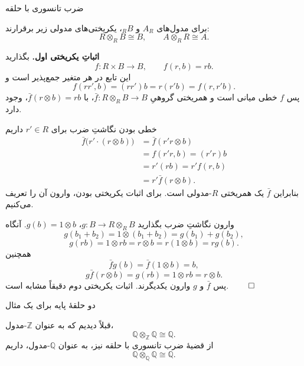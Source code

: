 \begin{frame}[t]{ضرب تانسوری با حلقه}
\label{lec20:unit-isomorphisms}
\begin{theorem}
برای مدول‌های \(A_R\) و \({}_R B\)، یکریختی‌های مدولی زیر برقرارند:
\[
    R\otimes_R B\cong B,\qquad A\otimes_R R\cong A.
\]
\end{theorem}
\textbf{اثباتِ یکریختی اول.} بگذارید
\[
    f:R\times B\longrightarrow B,\qquad f(r,b)=rb.
\]
این تابع در هر متغیر جمع‌پذیر است و
\[
    f(rr',b)=(rr')b=r(r'b)=f(r,r'b).
\]
پس \(f\) خطی میانی است و همریختی گروهیِ
\(\bar f:R\otimes_R B\to B\)، با \(\bar f(r\otimes b)=rb\)، وجود دارد.
\end{frame}

\begin{frame}[t]{خطی بودن نگاشتِ ضرب}
\label{lec20:unit-map-linear}
برای \(r'\in R\) داریم
\[
\begin{aligned}
\bar f\bigl(r'\cdot(r\otimes b)\bigr)
  &=\bar f(r'r\otimes b)\\
  &=f(r'r,b)=(r'r)b\\
  &=r'(rb)=r'f(r,b)\\
  &=r'\bar f(r\otimes b).
\end{aligned}
\]
بنابراین \(\bar f\) یک همریختی \(R\)-مدولی است. برای اثبات یکریختی بودن، وارون آن را تعریف می‌کنیم.
\end{frame}

\begin{frame}[t]{وارون نگاشتِ ضرب}
\label{lec20:unit-inverse}
بگذارید \(g:B\to R\otimes_R B\)، \(g(b)=1\otimes b\). آنگاه
\[
    g(b_1+b_2)=1\otimes(b_1+b_2)=g(b_1)+g(b_2),
\]
\[
    g(rb)=1\otimes rb=r\otimes b=r(1\otimes b)=rg(b).
\]
همچنین
\[
    \bar f g(b)=\bar f(1\otimes b)=b,
\]
\[
    g\bar f(r\otimes b)=g(rb)=1\otimes rb=r\otimes b.
\]
پس \(\bar f\) و \(g\) وارون یکدیگرند. اثبات یکریختی دوم دقیقاً مشابه است. \hfill\(\qed\)
\end{frame}

\begin{frame}[t]{دو حلقهٔ پایه برای یک مثال}
\label{lec20:rational-examples}
\begin{example}
قبلاً دیدیم که به عنوان \(\mathbb Z\)-مدول،
\[
    \mathbb Q\otimes_{\mathbb Z}\mathbb Q\cong\mathbb Q.
\]
از قضیهٔ ضرب تانسوری با حلقه نیز، به عنوان \(\mathbb Q\)-مدول، داریم
\[
    \mathbb Q\otimes_{\mathbb Q}\mathbb Q\cong\mathbb Q.
\]
\end{example}
\end{frame}

